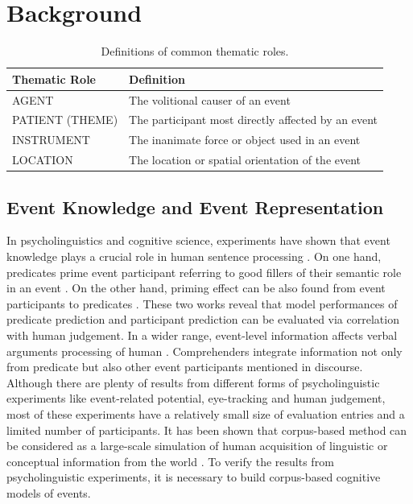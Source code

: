 \documentclass[a4paper]{article}
\begin{document}
\newpage
\section{Background}


\begin{table}[t]
\centering
\begin{tabular}{l|l}
\textbf{Thematic Role}  &   \textbf{Definition} \\ \hline
AGENT                   &   The volitional causer of an event \\
PATIENT (THEME)         &   The participant most directly affected by an event \\
INSTRUMENT              &   The inanimate force or object used in an event \\
LOCATION                &   The location or spatial orientation of the event \\
\end{tabular}
\caption{\label{tab:thematic} Definitions of common thematic roles.}
\end{table}


\subsection{Event Knowledge and Event Representation} \label{sec:event}
In psycholinguistics and cognitive science, experiments have shown that event knowledge plays a crucial role in human sentence processing \citep{camblin2007interplay}. On one hand, predicates prime event participant referring to good fillers of their semantic role in an event \citep{ferretti2001integrating}. On the other hand, priming effect can be also found from event participants to predicates \citep{mcrae2005basis}. These two works reveal that model performances of predicate prediction and participant prediction can be evaluated via correlation with human judgement. In a wider range, event-level information affects verbal arguments processing of human \citep{bicknell2010effects}. Comprehenders integrate information not only from predicate but also other event participants mentioned in discourse. Although there are plenty of results from different forms of psycholinguistic experiments like event-related potential, eye-tracking and human judgement, most of these experiments have a relatively small size of evaluation entries and a limited number of participants. It has been shown that corpus-based method can be considered as a large-scale simulation of human acquisition of linguistic or conceptual information from the world \citep{landauer1997solution}. To verify the results from psycholinguistic experiments, it is necessary to build corpus-based cognitive models of events. 
\end{document}
